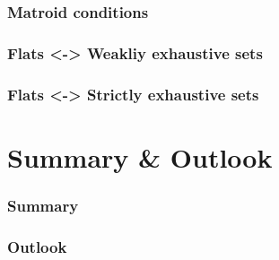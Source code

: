 \documentclass[bigger]{beamer}
\newcommand{\parentd}{../}
\begin{document}
\begin{frame}
\frametitle{Matroid conditions}
\end{frame}



\begin{frame}
\frametitle{Flats <-> Weakliy exhaustive sets}
\end{frame}



\begin{frame}
\frametitle{Flats <-> Strictly exhaustive sets}
\end{frame}
\section{Summary \& Outlook}



\begin{frame}
\frametitle{Summary}
\end{frame}



\begin{frame}
\frametitle{Outlook}

\end{frame}



\end{document}
